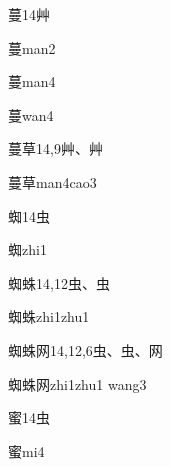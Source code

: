 \begin{Entry}{蔓}{14}{⾋}
  \begin{Phonetics}{蔓}{man2}
  \end{Phonetics}
  \begin{Phonetics}{蔓}{man4}
  \end{Phonetics}
  \begin{Phonetics}{蔓}{wan4}
  \end{Phonetics}
\end{Entry}

\begin{Entry}{蔓草}{14,9}{⾋、⾋}
  \begin{Phonetics}{蔓草}{man4cao3}
  \end{Phonetics}
\end{Entry}

\begin{Entry}{蜘}{14}{⾍}
  \begin{Phonetics}{蜘}{zhi1}
  \end{Phonetics}
\end{Entry}

\begin{Entry}{蜘蛛}{14,12}{⾍、⾍}
  \begin{Phonetics}{蜘蛛}{zhi1zhu1}
  \end{Phonetics}
\end{Entry}

\begin{Entry}{蜘蛛网}{14,12,6}{⾍、⾍、⽹}
  \begin{Phonetics}{蜘蛛网}{zhi1zhu1 wang3}
  \end{Phonetics}
\end{Entry}

\begin{Entry}{蜜}{14}{⾍}
  \begin{Phonetics}{蜜}{mi4}
  \end{Phonetics}
\end{Entry}

